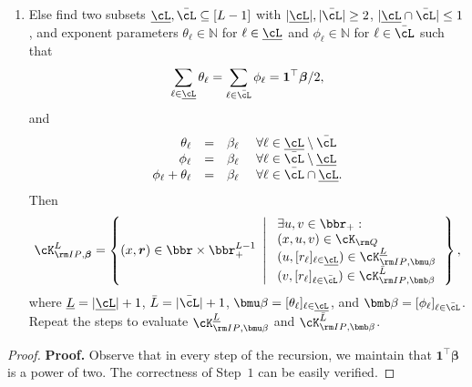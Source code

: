 \documentclass[opre, blindrev]{informs4}
\newcommand{\1}[1]{\mathds{1}{\left(#1\right)}}
\begin{document}
\begin{appendices}
\begin{theorem}
\begin{enumerate}[Step 1.]
\item Else find two subsets $\underline \cL, \bar \cL  \subseteq [L-1]$ with $|\underline \cL|, |\bar \cL| \geq 2$, $|\underline \cL \cap \bar \cL| \leq 1$, and exponent parameters $\theta_\ell \in \mathbb{N}$ for $\ell \in \underline \cL$ and $\phi_\ell \in \mathbb{N}$ for $\ell \in \bar \cL$ such that 
$$
\sum_{\ell \in \underline \cL} \theta_\ell = \sum_{\ell \in \bar\cL} \phi_\ell = \bm 1^\top \bm \beta/2,
$$
and
$$
\begin{array}{rcll} 
\theta_\ell &=& \beta_\ell &~\forall \ell \in \underline \cL \setminus \bar \cL \\
\phi_\ell &=& \beta_\ell &~\forall \ell \in \bar \cL \setminus \underline  \cL \\
\phi_\ell + \theta_\ell &=& \beta_\ell &~\forall \ell \in \bar \cL \cap  \underline  \cL.
\end{array}
$$
Then 
$$
\cK^{L}_{{\rm IP},\bm \beta} = \left\{ (x,\bm r) \in \bbr\times \bbr^{L-1}_+ ~\left|~ 
\begin{array}{ll} \exists u,  v \in \bbr_+: \\
(x,u,v) \in \cK_{{\rm Q}} \\
(u, [r_\ell]_{\ell \in \underline \cL}) \in \cK^{\underline L}_{{\rm IP},\bmu \beta} \\
(v, [r_\ell]_{\ell \in \bar \cL}) \in \cK^{\bar L}_{{\rm IP},{\bmb \beta}} \\
\end{array}
\right.\right\},
$$
where $\underline L = | \underline \cL|+1$, $\bar L = | \bar \cL|+1$, $\bmu \beta = [\theta_\ell]_{\ell \in \underline \cL}$, and $\bmb \beta = [\phi_\ell]_{\ell \in \bar \cL}$. Repeat the steps to evaluate $ \cK^{\underline L}_{{\rm IP},\bmu \beta}$ and $\cK^{\bar L}_{{\rm IP},{\bmb \beta}}$.
\end{enumerate}
\end{theorem}
\begin{proof}{\bf Proof.}
Observe that in every step of the recursion, we maintain that $\bm 1^\top \bm \beta$ is a power of two. The correctness of Step~$1$ can be easily verified. 


\end{proof}
\end{appendices}
\end{document}
